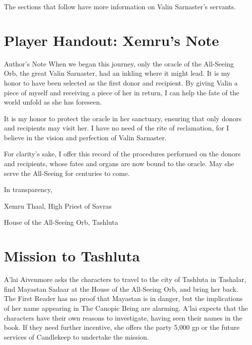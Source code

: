 \documentclass[10pt,a4paper,twoside,bg=print,twocolumn,openany,nodeprecatedcode]{dndbook}
\begin{document}
The sections that follow have more information on Valin Sarnaster's servants.

\section{Player Handout: Xemru's Note}
\begin{DndSidebar}[float=!b]{Author's Note}
When we began this journey, only the oracle of the All-Seeing Orb, the great Valin Sarnaster, had an inkling where it might lead. It is my honor to have been selected as the first donor and recipient. By giving Valin a piece of myself and receiving a piece of her in return, I can help the fate of the world unfold as she has foreseen.



It is my honor to protect the oracle in her sanctuary, ensuring that only donors and recipients may visit her. I have no need of the rite of reclamation, for I believe in the vision and perfection of Valin Sarnaster.



For clarity's sake, I offer this record of the procedures performed on the donors and recipients, whose fates and organs are now bound to the oracle. May she serve the All-Seeing for centuries to come.



In transparency,



Xemru Thaal, High Priest of Savras



House of the All-Seeing Orb, Tashluta



\end{DndSidebar}

\section{Mission to Tashluta}
A'lai Aivenmore asks the characters to travel to the city of Tashluta in Tashalar, find Mayastan Sadaar at the House of the All-Seeing Orb, and bring her back. The First Reader has no proof that Mayastan is in danger, but the implications of her name appearing in The Canopic Being are alarming. A'lai expects that the characters have their own reasons to investigate, having seen their names in the book. If they need further incentive, she offers the party 5,000 gp or the future services of Candlekeep to undertake the mission.
\end{document}
